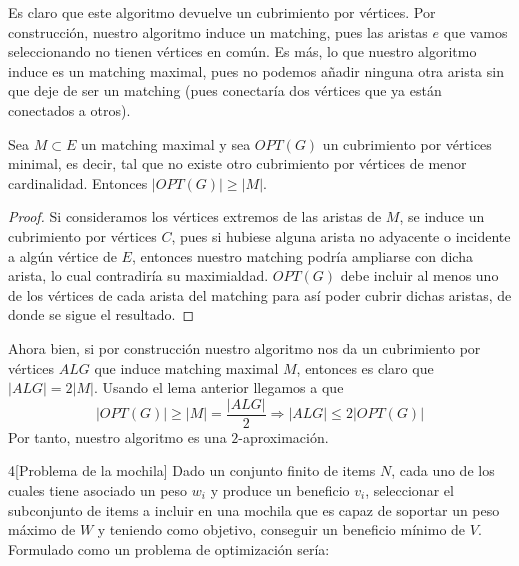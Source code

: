 \documentclass[twoside]{article}
\begin{document}
\begin{solucion}
Es claro que este algoritmo devuelve un cubrimiento por vértices. Por construcción, nuestro algoritmo induce un matching, pues las aristas $e$ que vamos seleccionando no tienen vértices en común. Es más, lo que nuestro algoritmo induce es un matching maximal, pues no podemos añadir ninguna otra arista sin que deje de ser un matching (pues conectaría dos vértices que ya están conectados a otros). 
\begin{lemma}
Sea $M \subset E$ un matching maximal y sea $OPT(G)$ un cubrimiento por vértices minimal, es decir, tal que no existe otro cubrimiento por vértices de menor cardinalidad. Entonces $|OPT(G)|\geq |M|$.
\end{lemma}
\begin{proof}
Si consideramos los vértices extremos de las aristas de $M$, se induce un cubrimiento por vértices $C$, pues si hubiese alguna arista no adyacente o incidente a algún vértice de $E$, entonces nuestro matching podría ampliarse con dicha arista, lo cual contradiría su maximialdad. $OPT(G)$ debe incluir al menos uno de los vértices de cada arista del matching para así poder cubrir dichas aristas, de donde se sigue el resultado.
\end{proof}
Ahora bien, si por construcción nuestro algoritmo nos da un cubrimiento por vértices $ALG$ que induce matching maximal $M$, entonces es claro que $|ALG| = 2|M|$. Usando el lema anterior llegamos a que
$$
|OPT(G)| \geq |M| = \frac{|ALG|}{2} \Rightarrow |ALG| \leq 2|OPT(G)|
$$
Por tanto, nuestro algoritmo es una $2$-aproximación. \end{solucion}



\newpage

\begin{ejercicio}{4}[Problema de la mochila] Dado un conjunto finito de items $N$, cada uno de los cuales tiene asociado un peso $w_i$ y produce un beneficio $v_i$, seleccionar el subconjunto de items a incluir en una mochila que es capaz de soportar un peso máximo de $W$ y teniendo como objetivo, conseguir un beneficio mínimo de $V$. Formulado como un problema de optimización sería:
\end{ejercicio}

\begin{solucion}
\end{solucion}
\end{document}
